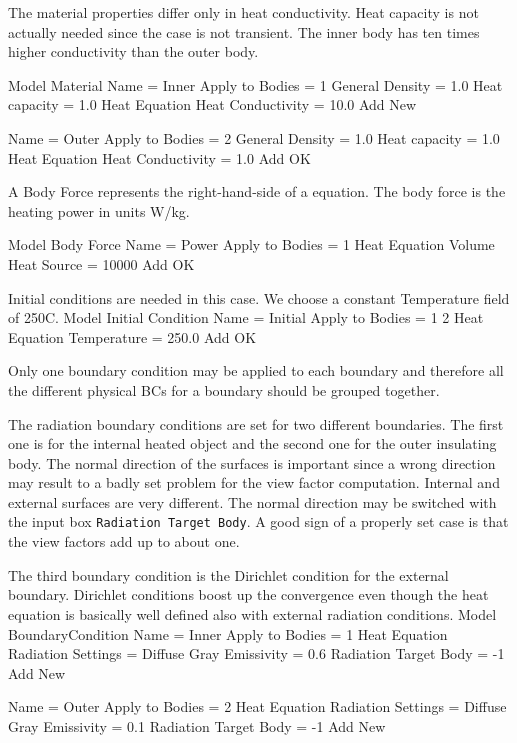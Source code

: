The material properties differ only in heat conductivity. Heat capacity is not
actually needed since the case is not transient. The inner body has ten times
higher conductivity than the outer body.

\ttbegin
Model
  Material
    Name = Inner
    Apply to Bodies = 1 
    General 
      Density = 1.0
      Heat capacity = 1.0
    Heat Equation
      Heat Conductivity = 10.0
    Add
    New

    Name = Outer
    Apply to Bodies = 2 
    General 
      Density = 1.0
      Heat capacity = 1.0
    Heat Equation
      Heat Conductivity = 1.0
    Add
    OK
\ttend

A Body Force represents the right-hand-side of a equation. The body 
force is the heating power in units W/kg. 
 

\ttbegin
Model
  Body Force
    Name = Power
    Apply to Bodies = 1
    Heat Equation
       Volume Heat Source = 10000
    Add 
    OK
\ttend    

Initial conditions are needed in this case. We choose a 
constant Temperature field of 250C. 
\ttbegin
Model
  Initial Condition 
    Name = Initial
    Apply to Bodies = 1 2
    Heat Equation
      Temperature = 250.0
    Add 
    OK
\ttend

Only one boundary condition may be applied to each boundary and therefore all the 
different physical BCs for a boundary should be grouped together. 

The radiation boundary conditions are set for two different boundaries. The first one
is for the internal heated object and the second one for the outer insulating body. 
The normal direction of the surfaces is important since a wrong direction may 
result to a badly set problem for the view factor computation. Internal and 
external surfaces are very different.  The normal direction may be switched 
with the input box \texttt{Radiation Target Body}. A good sign of a properly 
set case is that the view factors add up to about one.

The third boundary condition is the Dirichlet condition for the external boundary.
Dirichlet conditions boost up the convergence even though the heat equation 
is basically well defined also with external radiation conditions.
\ttbegin
Model
  BoundaryCondition
    Name = Inner
    Apply to Bodies = 1
    Heat Equation
      Radiation Settings = Diffuse Gray
      Emissivity = 0.6
      Radiation Target Body = -1
    Add
    New

    Name = Outer
    Apply to Bodies = 2
    Heat Equation
      Radiation Settings = Diffuse Gray
      Emissivity = 0.1
      Radiation Target Body = -1
    Add 
    New

